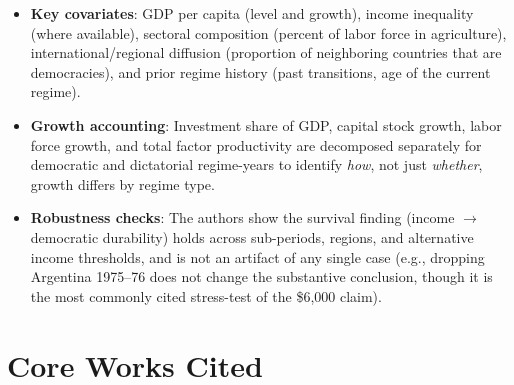 \documentclass[12pt]{article}
\begin{document}
\begin{itemize}[leftmargin=*, itemsep=4pt]
    \item \textbf{Key covariates}: GDP per capita (level and growth), income inequality (where available), sectoral composition (percent of labor force in agriculture), international/regional diffusion (proportion of neighboring countries that are democracies), and prior regime history (past transitions, age of the current regime).
    \item \textbf{Growth accounting}: Investment share of GDP, capital stock growth, labor force growth, and total factor productivity are decomposed separately for democratic and dictatorial regime-years to identify \textit{how}, not just \textit{whether}, growth differs by regime type.
    \item \textbf{Robustness checks}: The authors show the survival finding (income $\to$ democratic durability) holds across sub-periods, regions, and alternative income thresholds, and is not an artifact of any single case (e.g., dropping Argentina 1975--76 does not change the substantive conclusion, though it is the most commonly cited stress-test of the \$6,000 claim).
\end{itemize}

\section{Core Works Cited}
\end{document}
